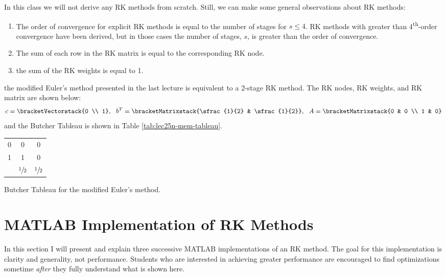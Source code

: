 In this class we will not derive any RK methods from scratch.  Still, we can make some general observations about RK methods:
\begin{enumerate}
\item The order of convergence for explicit RK methods is equal to the number of stages for $s\le 4$.  RK methods with greater than 4\textsuperscript{th}-order convergence have been derived, but in those cases the number of stages, $s$, is greater than the order of convergence.

\item The sum of each row in the RK matrix is equal to the corresponding RK node.
\item the sum of the RK weights is equal to 1.
\end{enumerate}

 the modified Euler's method presented in the last lecture is equivalent to a 2-stage RK method. The RK nodes, RK weights, and RK matrix are shown below:
\begin{equation*}
c = \bracketVectorstack{0 \\ 1}, \ \ b^{T} = \bracketMatrixstack{\sfrac{1}{2} & \sfrac{1}{2}}, \ \ A = \bracketMatrixstack{0 & 0 \\ 1 & 0}
\end{equation*}
and the Butcher Tableau is shown in Table \ref{tab:lec25n-mem-tableau}.
\begin{margintable}
\begin{tabular}{c|cc}
0 & 0 & 0 \\
1 & 1 & 0 \\ \hline
  & $\sfrac{1}{2}$ & $\sfrac{1}{2}$ \\
\end{tabular}
\caption{Butcher Tableau for the modified Euler's method.}
\label{tab:lec25n-mem-tableau}
\end{margintable}

\section{MATLAB Implementation of RK Methods}

In this section I will present and explain three successive MATLAB implementations of an RK method.  The goal for this implementation is clarity and generality, not performance.  Students who are interested in achieving greater performance are encouraged to find optimizations sometime \emph{after} they fully understand what is shown here.

